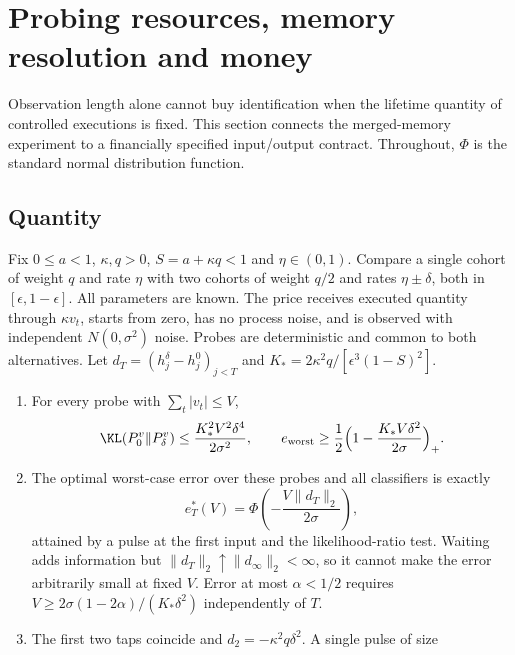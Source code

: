 \section{Probing resources, memory resolution and money}\label{p1:sec:resources}

Observation length alone cannot buy identification when the lifetime quantity of controlled executions is fixed. This section connects the merged-memory experiment to a financially specified input/output contract. Throughout, $\Phi$ is the standard normal distribution function.

\subsection{Quantity}

\begin{theorem}\label{p1:thm:quantity}
Fix $0\le a<1$, $\kappa,q>0$, $S=a+\kappa q<1$ and $\eta\in(0,1)$. Compare a single cohort of weight $q$ and rate $\eta$ with two cohorts of weight $q/2$ and rates $\eta\pm\delta$, both in $[\epsilon,1-\epsilon]$. All parameters are known. The price receives executed quantity through $\kappa v_t$, starts from zero, has no process noise, and is observed with independent $N(0,\sigma^2)$ noise. Probes are deterministic and common to both alternatives. Let $d_T=(h^\delta_j-h^0_j)_{j<T}$ and $K_*=2\kappa^2q/[\epsilon^3(1-S)^2]$.
\begin{enumerate}[label=(\roman*)]
\item For every probe with $\sum_t|v_t|\le V$,
\begin{equation}\label{p1:eq:klV}
\KL(P_0^v\|P_\delta^v)\le\frac{K_*^2V^2\delta^4}{2\sigma^2},\qquad e_{\rm worst}\ge\frac12\Bigl(1-\frac{K_*V\delta^2}{2\sigma}\Bigr)_+ .
\end{equation}
\item The optimal worst-case error over these probes and all classifiers is exactly
\begin{equation}\label{p1:eq:exacterr}
e^*_T(V)=\Phi\!\left(-\frac{V\|d_T\|_2}{2\sigma}\right),
\end{equation}
attained by a pulse at the first input and the likelihood-ratio test. Waiting adds information but $\|d_T\|_2\uparrow\|d_\infty\|_2<\infty$, so it cannot make the error arbitrarily small at fixed $V$. Error at most $\alpha<1/2$ requires $V\ge2\sigma(1-2\alpha)/(K_*\delta^2)$ independently of $T$.
\item The first two taps coincide and $d_2=-\kappa^2q\delta^2$. A single pulse of size

\end{enumerate}
\end{theorem}
